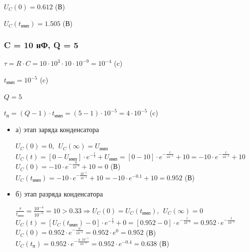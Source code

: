 	$U_C(0) = 0.612$ (В)
	
	$U_C(t_\text{имп}) = 1.505$ (В)
	
\subsubsection{C = 10 нФ, Q = 5}

		$\tau = R \cdot C = 10 \cdot 10^3 \cdot 10 \cdot 10^{-9} = 10^{-4}$ (c)
		
		$t_\text{имп} = 10^{-5}$ (c)
		
		$Q = 5$		
		
		$t_\text{п} = (Q - 1) \cdot t_\text{имп} = (5 - 1) \cdot 10^{-5} = 4 \cdot 10^{-5}$ (c)
		
		
\begin{itemize}
\item[] а) этап заряда конденсатора

		$U_C(0) = 0,\ \ U_C(\infty) = U_\text{имп}$\\	
		$U_C(t) = [0 - U_\text{имп}] \cdot e^{-\frac{t}{\tau}} + U_\text{имп} = [0 - 10] \cdot e^{-\frac{t}{10^{-4}}} + 10 = -10 \cdot e^{-\frac{t}{10^{-4}}} + 10$\\
		$U_C(0) = -10 \cdot e^{-\frac{0}{10^{-4}}} + 10 = 0$ (В)\\
		$U_C(t_\text{имп}) = -10 \cdot e^{-\frac{10^{-5}}{10^{-4}}} + 10 = -10 \cdot e^{-0.1} + 10 = 0.952$ (В)\\
		
\item[] б) этап разряда конденсатора
	
		$\frac{\tau}{t_\text{имп}} = \frac{10^{-4}}{10^{-5}} = 10 > 0.33 \Rightarrow U_C(0) = U_C(t_\text{имп}),\ \ U_C(\infty) = 0$\\
		$U_C(t) = [U_C(t_\text{имп}) - 0] \cdot e^{-\frac{t}{\tau}} + 0 =  [0.952 - 0] \cdot e^{-\frac{t}{10^{-4}}} = 0.952 \cdot e^{-\frac{t}{10^{-4}}}$\\
		$U_C(0) = 0.952 \cdot e^{-\frac{0}{10^{-4}}} = 0.952 \cdot e^0 = 0.952$ (В)\\
		$U_C(t_\text{п}) = 0.952 \cdot e^{-\frac{4 \cdot 10^{-5}}{10^{-4}}} = 0.952 \cdot e^{-0.4} = 0.638$ (В)\\
		
\end{itemize}				
		
